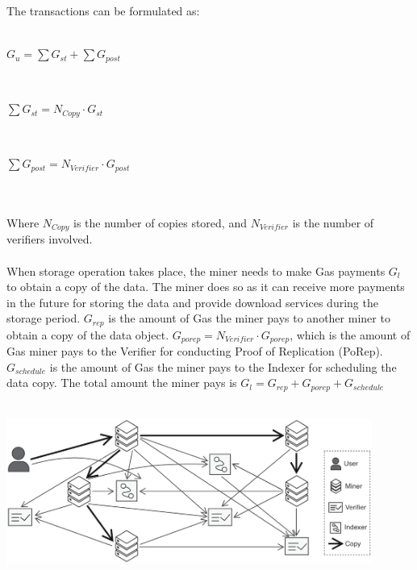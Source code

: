 \documentclass[10pt,a4paper]{article}
\begin{document}
\noindent   
The transactions can be formulated as:
 \vspace{-0.6em}
\\\\
\centerline{$G_{u} = \sum G_{st} + \sum G_{post}$}\\
\centerline{$\sum G_{st}=N_{Copy} \cdot G_{st} $}\\
\centerline{$\sum G_{post}=N_{Verifier}\cdot G_{post}$}
 \vspace{-1.5em}
\\\\Where $N_{Copy}$ is the number of copies stored, and $N_{Verifier}$ is the number of verifiers involved.
 \vspace{-0.6em}
\\\\When storage operation takes place, the miner needs to make Gas payments $G_{l}$ to obtain a copy of the data. The miner does so as it can receive more payments in the future for storing the data and provide download services during the storage period. $G_{rep}$ is the amount of Gas the miner pays to another miner to obtain a copy of the data object. $G_{porep} = N_{Verifier} \cdot G_{porep}$, which is the amount of Gas miner pays to the Verifier for conducting Proof of Replication (PoRep). $G_{schedule}$ is the amount of Gas the miner pays to the Indexer for scheduling the data copy. The total amount the miner pays is $G_{l} = G_{rep} + G_{porep} + G_{schedule}$
\\\\ \centerline{\includegraphics[width=340pt]{fig21}}
\end{document}
